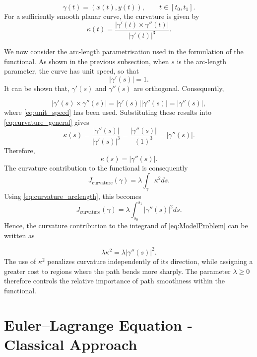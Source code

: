 $$
\gamma(t)=(x(t),y(t)),
\qquad t\in[t_0,t_1].
$$
For a sufficiently smooth planar curve, the curvature is given by
\begin{equation}
\kappa(t) = 
\frac{\left|\gamma'(t)\times\gamma''(t)\right|}
{\left|\gamma'(t)\right|^3}.
\label{eq:curvature_general}
\end{equation}

We now consider the arc-length parametrisation used in the formulation
of the functional. As shown in the previous subsection, when $s$ is
the arc-length parameter, the curve has unit speed, so that
\begin{equation}
\left|\gamma'(s)\right|=1.
\label{eq:unit_speed}
\end{equation}
It can be shown that, $\gamma'(s)$ and $\gamma''(s)$ are orthogonal. Consequently,

$$
\left|\gamma'(s)\times\gamma''(s)\right|
=
\left|\gamma'(s)\right|
\left|\gamma''(s)\right|
=
\left|\gamma''(s)\right|,
$$
where \eqref{eq:unit_speed} has been used. Substituting these results into \eqref{eq:curvature_general} gives
$$
\kappa(s)
=
\frac{\left|\gamma''(s)\right|}
{\left|\gamma'(s)\right|^3}
=\frac{\left|\gamma''(s)\right|}
{(1)^3} = 
\left|\gamma''(s)\right|.
$$
Therefore,
\begin{equation}
\kappa(s)=\left|\gamma''(s)\right|.
\label{eq:curvature_arclength}
\end{equation}
The curvature contribution to the functional is consequently
\begin{equation}
J_{\mathrm{curvature}}(\gamma)=
\lambda\int_\gamma\kappa^2 ds.
\label{eq:curvature_functional}
\end{equation}
Using \eqref{eq:curvature_arclength}, this becomes
$$
J_{\mathrm{curvature}}(\gamma)
=
\lambda
\int_{s_0}^{s_1}
\left|\gamma''(s)\right|^2 ds.
$$
Hence, the curvature contribution to the integrand of
\eqref{eq:ModelProblem} can be written as

$$
\lambda\kappa^2
=
\lambda\left|\gamma''(s)\right|^2.
$$
The use of $\kappa^2$ penalizes curvature independently of its
direction, while assigning a greater cost to regions where the path
bends more sharply. The parameter $\lambda\geq0$ therefore controls the
relative importance of path smoothness within the functional.

\section{Euler--Lagrange Equation - Classical Approach}

